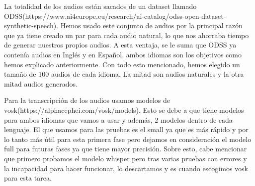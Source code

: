 \documentclass{article}
\begin{document}
La totalidad de los audios están sacados de un dataset llamado ODSS(https://www.ai4europe.eu/research/ai-catalog/odss-open-dataset-synthetic-speech). Hemos usado este conjunto de audios por la principal razón que ya tiene creado un par para cada audio natural, lo que nos ahorraba tiempo de generar nuestros propios audios. A esta ventaja, se le suma que ODSS ya contenía audios en Inglés y en Español, ambos idiomas son los objetivos como hemos explicado anteriormente.
Con todo esto mencionado, hemos elegido un tamaño de 100 audios de cada idioma. La mitad son audios naturales y la otra mitad audios generados.

Para la transcripción de los audios usamos modelos de vosk(https://alphacephei.com/vosk/models). Esto se debe a que tiene modelos para ambos idiomas que vamos a usar y además, 2 modelos dentro de cada lenguaje. El que usamos para las pruebas es el small  ya que es más rápido y por lo tanto más útil para esta primera fase pero dejamos en consideración el modelo full para futuras fases ya que tiene mayor precisión. 
Sobre esto, cabe mencionar que primero probamos el modelo whisper pero tras varias pruebas con errores y la incapacidad para hacer funcionar, lo descartamos y es cuando escogimos vosk para esta tarea.
\end{document}
